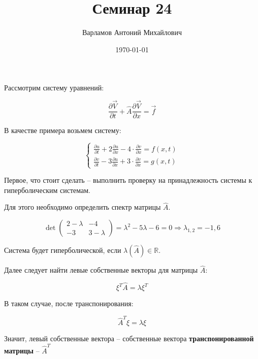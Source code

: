 \documentclass[10pt,a4paper]{article}
\title{Семинар 24}
\date{\today}
\author{Варламов Антоний Михайлович}
\begin{document}
	\maketitle
	
	Рассмотрим систему уравнений:
	
	\begin{equation}
		\frac{\partial \vec{V}}{\partial t} + \hat{A}\frac{\partial \vec{V}}
		{\partial x} = \vec{f}
	\end{equation}
	
	В качестве примера возьмем систему:
	
	\begin{equation}
		\begin{cases}
			\frac{\partial u}{\partial t} + 2\frac{\partial u}{\partial x} - 
			4\cdot\frac{\partial v}{\partial x} = f\left(x, t\right)
			\\
			\frac{\partial v}{\partial t} - 3\frac{\partial u}{\partial x} + 
			3\cdot\frac{\partial v}{\partial x} = g\left(x, t\right)
		\end{cases}
	\end{equation}
	
	Первое, что стоит сделать -- выполнить проверку на принадлежность системы 
	к гиперболическим системам.
	
	Для этого необходимо определить спектр матрицы $\hat{A}$.
	
	\begin{equation}
		\det\begin{pmatrix}
			2 - \lambda & -4 \\
			-3 & 3 - \lambda
		\end{pmatrix} = \lambda^{2} - 5\lambda - 6 = 0 \Rightarrow 
		\lambda_{1, 2} = -1, 6
	\end{equation}
	
	Система будет гиперболической, если $\lambda\left(\hat{A}\right) \in 
	\mathbb{R}$.
	
	Далее следует найти левые собственные векторы для матрицы $\hat{A}$:
	
	\begin{equation}
		\xi^{T}\hat{A} = \lambda\xi^{T}
	\end{equation}
	
	В таком случае, после транспонирования:
	
	\begin{equation}
		\hat{A}^{T} \xi = \lambda\xi
	\end{equation}
	
	Значит, левый собственные вектора -- собственные вектора 
	\textbf{транспонированной матрицы} -- $\hat{A}^{T}$
	
\end{document}
